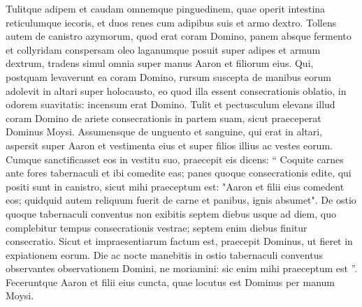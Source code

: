 \begin{biblechapter}
\begin{biblechapter}
\begin{biblechapter}
\begin{biblechapter}
\begin{biblechapter}
\begin{biblechapter}
\begin{biblechapter}
\begin{biblechapter}
 \verse Tulitque adipem et caudam omnemque pinguedinem, quae operit intestina reticulumque iecoris, et duos renes cum adipibus suis et armo dextro. 
\verse Tollens autem de canistro azymorum, quod erat coram Domino, panem absque fermento et collyridam conspersam oleo laganumque posuit super adipes et armum dextrum, 
\verse tradens simul omnia super manus Aaron et filiorum eius. Qui, postquam levaverunt ea coram Domino, 
\verse rursum suscepta de manibus eorum adolevit in altari super holocausto, eo quod illa essent consecrationis oblatio, in odorem suavitatis: incensum erat Domino. 
\verse Tulit et pectusculum elevans illud coram Domino de ariete consecrationis in partem suam, sicut praeceperat Dominus Moysi. 
\verse Assumensque de unguento et sanguine, qui erat in altari, aspersit super Aaron et vestimenta eius et super filios illius ac vestes eorum.
 \verse Cumque sanctificasset eos in vestitu suo, praecepit eis dicens: “ Coquite carnes ante fores tabernaculi et ibi comedite eas; panes quoque consecrationis edite, qui positi sunt in canistro, sicut mihi praeceptum est: "Aaron et filii eius comedent eos; 
\verse quidquid autem reliquum fuerit de carne et panibus, ignis absumet". 
\verse De ostio quoque tabernaculi conventus non exibitis septem diebus usque ad diem, quo complebitur tempus consecrationis vestrae; septem enim diebus finitur consecratio. 
\verse Sicut et impraesentiarum factum est, praecepit Dominus, ut fieret in expiationem eorum. 
\verse Die ac nocte manebitis in ostio tabernaculi conventus observantes observationem Domini, ne moriamini: sic enim mihi praeceptum est ”.
 \verse Feceruntque Aaron et filii eius cuncta, quae locutus est Dominus per manum Moysi.
 

\end{biblechapter}
\end{biblechapter}
\end{biblechapter}
\end{biblechapter}
\end{biblechapter}
\end{biblechapter}
\end{biblechapter}
\end{biblechapter}
